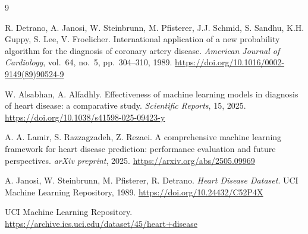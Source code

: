 \documentclass{article}
\begin{document}
\begin{thebibliography}{9}

    R. Detrano, A. Janosi, W. Steinbrunn, M. Pfisterer, J.J. Schmid, S. Sandhu, K.H. Guppy, S. Lee, V. Froelicher.
    International application of a new probability algorithm for the diagnosis of coronary artery disease.
    \textit{American Journal of Cardiology}, vol.\ 64, no.\ 5, pp.\ 304--310, 1989.
    \url{https://doi.org/10.1016/0002-9149(89)90524-9}

    W. Alsabhan, A. Alfadhly.
    Effectiveness of machine learning models in diagnosis of heart disease: a comparative study.
    \textit{Scientific Reports}, 15, 2025.
    \url{https://doi.org/10.1038/s41598-025-09423-y}

A. A. Lamir, S. Razzagzadeh, Z. Rezaei.
    A comprehensive machine learning framework for heart disease prediction: performance evaluation and future perspectives.
    \textit{arXiv preprint}, 2025.
    \url{https://arxiv.org/abs/2505.09969}

    A. Janosi, W. Steinbrunn, M. Pfisterer, R. Detrano.
    \textit{Heart Disease Dataset}.
    UCI Machine Learning Repository, 1989.
    \url{https://doi.org/10.24432/C52P4X}

    UCI Machine Learning Repository.
    \url{https://archive.ics.uci.edu/dataset/45/heart+disease}





\end{thebibliography}
\end{document}
